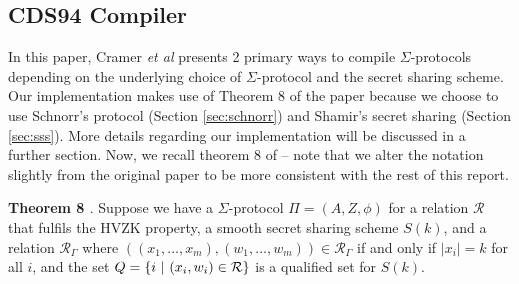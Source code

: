 \subsection{CDS94 Compiler}
In this paper, Cramer {\em{et al}} \cite{CDS94} presents 2 primary ways to compile $\Sigma$-protocols depending 
on the underlying choice of $\Sigma$-protocol and the secret sharing scheme. Our implementation makes use of Theorem 
8 of the paper because we choose to use Schnorr's protocol (Section \ref{sec:schnorr}) and Shamir's secret sharing 
(Section \ref{sec:sss}). More details regarding our implementation will be discussed in a further section. Now, we recall 
theorem 8 of \cite{CDS94} -- note that we alter the notation slightly from the original paper to be more consistent 
with the rest of this report.






\textbf{Theorem 8 \cite{CDS94}}. Suppose we have a $\Sigma$-protocol $\Pi = (A, Z, \phi)$ for a relation $\mathcal R$ that fulfils the HVZK property, a smooth secret sharing scheme $S(k)$, and a relation $\mathcal R_\Gamma$ where $((x_1,\ldots,x_m),(w_1,\ldots,w_m)) \in \mathcal R_\Gamma$ if and only if $|x_i| = k$ for all $i$, and the set $Q = \{i \ \vert\  (x_i,w_i) \in \mathcal R\}$  is a qualified set for $S(k)$.

